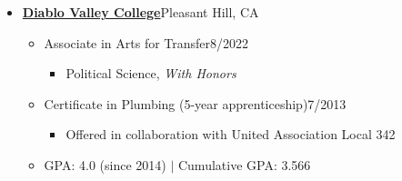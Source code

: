 \begin{itemize}[leftmargin=0em, itemsep=0pt]
\begin{itemize}[leftmargin=2em, itemsep=0pt]
    \item[] Associate in Arts for Transfer\hfill{}8/2022
    \begin{itemize}[leftmargin=2em, itemsep=0pt]
        \item[] Sociology, \textit{With Honors}
        \item[] Liberal Arts: Behavioral Science \& Social Science, \textit{With Honors}
    \end{itemize}
    \item[] \href{https://www.losmedanos.edu/honors/prog.aspx}{Honors Scholar} (the college’s highest distinction)
    \item[] GPA: 4.0 (since 2014) $|$ Cumulative GPA: 3.874
\end{itemize}
\vspace{12pt}
\item[] \textbf{\href{https://www.dvc.edu/}{Diablo Valley College}}\hfill{}Pleasant Hill, CA
\begin{itemize}[leftmargin=2em, itemsep=0pt]
    \item[] Associate in Arts for Transfer\hfill{}8/2022
    \begin{itemize}[leftmargin=2em, itemsep=0pt]
        \item[] Political Science, \textit{With Honors}
    \end{itemize}
    \item[] Certificate in Plumbing (5-year apprenticeship)\hfill{}7/2013
    \begin{itemize}[leftmargin=2em, itemsep=0pt]
        \item[] Offered in collaboration with United Association Local 342
    \end{itemize}
    \item[] GPA: 4.0 (since 2014) $|$ Cumulative GPA: 3.566
\end{itemize}
\end{itemize}
